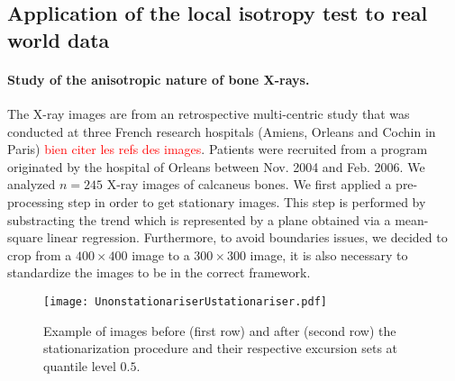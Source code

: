 \documentclass[12pt]{article}
\theoremstyle{Theorem}
\theoremstyle{definition}
\begin{document}
\subsection{Application of the local isotropy test to real world data}
\paragraph{Study of the anisotropic nature of bone X-rays.}
The X-ray images are from an retrospective multi-centric study that was conducted at
three French research hospitals (Amiens, Orleans and Cochin in Paris) \textcolor{red}{bien citer les refs des images}. Patients were recruited from a program originated by the hospital of Orleans between Nov. 2004 and Feb. 2006. We analyzed $n=245$ X-ray images of calcaneus bones. 
We first applied a pre-processing step in order to get stationary images. This step is performed by substracting the trend which is represented by a plane obtained via a mean-square linear regression. Furthermore, to avoid boundaries issues, we decided to crop from a $400\times400$  image to a $300\times300$ image, it is also necessary to standardize the images to be in the correct framework.
\begin{figure}[H]
\centering
{\texttt{[image: UnonstationariserUstationariser.pdf]}}
 \caption{Example of images before (first row) and after (second row) the stationarization procedure and their respective excursion sets at quantile level $0.5$.}
\label{fig22}
\end{figure}
\end{document}
